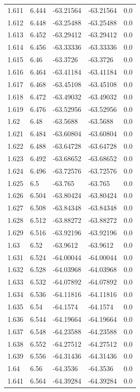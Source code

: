 \begin{tabular}{lllll}
1.611 & 6.444 & -63.21564 & -63.21564 & 0.0 \\
1.612 & 6.448 & -63.25488 & -63.25488 & 0.0 \\
1.613 & 6.452 & -63.29412 & -63.29412 & 0.0 \\
1.614 & 6.456 & -63.33336 & -63.33336 & 0.0 \\
1.615 & 6.46 & -63.3726 & -63.3726 & 0.0 \\
1.616 & 6.464 & -63.41184 & -63.41184 & 0.0 \\
1.617 & 6.468 & -63.45108 & -63.45108 & 0.0 \\
1.618 & 6.472 & -63.49032 & -63.49032 & 0.0 \\
1.619 & 6.476 & -63.52956 & -63.52956 & 0.0 \\
1.62 & 6.48 & -63.5688 & -63.5688 & 0.0 \\
1.621 & 6.484 & -63.60804 & -63.60804 & 0.0 \\
1.622 & 6.488 & -63.64728 & -63.64728 & 0.0 \\
1.623 & 6.492 & -63.68652 & -63.68652 & 0.0 \\
1.624 & 6.496 & -63.72576 & -63.72576 & 0.0 \\
1.625 & 6.5 & -63.765 & -63.765 & 0.0 \\
1.626 & 6.504 & -63.80424 & -63.80424 & 0.0 \\
1.627 & 6.508 & -63.84348 & -63.84348 & 0.0 \\
1.628 & 6.512 & -63.88272 & -63.88272 & 0.0 \\
1.629 & 6.516 & -63.92196 & -63.92196 & 0.0 \\
1.63 & 6.52 & -63.9612 & -63.9612 & 0.0 \\
1.631 & 6.524 & -64.00044 & -64.00044 & 0.0 \\
1.632 & 6.528 & -64.03968 & -64.03968 & 0.0 \\
1.633 & 6.532 & -64.07892 & -64.07892 & 0.0 \\
1.634 & 6.536 & -64.11816 & -64.11816 & 0.0 \\
1.635 & 6.54 & -64.1574 & -64.1574 & 0.0 \\
1.636 & 6.544 & -64.19664 & -64.19664 & 0.0 \\
1.637 & 6.548 & -64.23588 & -64.23588 & 0.0 \\
1.638 & 6.552 & -64.27512 & -64.27512 & 0.0 \\
1.639 & 6.556 & -64.31436 & -64.31436 & 0.0 \\
1.64 & 6.56 & -64.3536 & -64.3536 & 0.0 \\
1.641 & 6.564 & -64.39284 & -64.39284 & 0.0 \\

\end{tabular}
